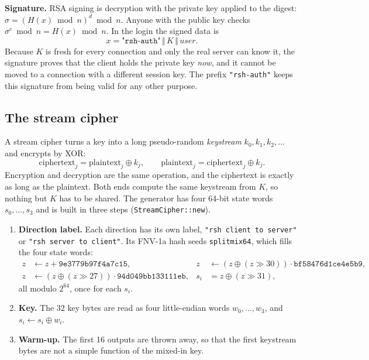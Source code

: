 \textbf{Signature.} RSA signing is decryption with the private key applied to
the digest: $\sigma = (H(x) \bmod n)^{d} \bmod n$. Anyone with the public key
checks $\sigma^{e} \bmod n = H(x) \bmod n$. In the login the signed data is
\[
  x = \texttt{"rsh-auth"} \,\Vert\, K \,\Vert\, \textit{user}.
\]
Because $K$ is fresh for every connection and only the real server can know it,
the signature proves that the client holds the private key \emph{now}, and it
cannot be moved to a connection with a different session key. The prefix
\texttt{"rsh-auth"} keeps this signature from being valid for any other purpose.

\begin{table}[H]
\centering
\footnotesize

\caption{The login signature of the recorded session. $n_c$, $d_c$ are the client's key (\texttt{id\_rsh}).}
\label{tab:auth}
\end{table}

\subsection{The stream cipher}
\label{sec:cipher}

A stream cipher turns a key into a long pseudo-random \emph{keystream}
$k_0, k_1, k_2, \ldots$ and encrypts by XOR:
\[
  \text{ciphertext}_j = \text{plaintext}_j \oplus k_j, \qquad
  \text{plaintext}_j = \text{ciphertext}_j \oplus k_j .
\]
Encryption and decryption are the same operation, and the ciphertext is exactly
as long as the plaintext. Both ends compute the same keystream from $K$, so
nothing but $K$ has to be shared. The generator has four 64-bit state words
$s_0, \ldots, s_3$ and is built in three steps (\texttt{StreamCipher::new}).

\begin{enumerate}
\item \textbf{Direction label.} Each direction has its own label,
  \texttt{"rsh client to server"} or \texttt{"rsh server to client"}. Its
  FNV-1a hash seeds \texttt{splitmix64}, which fills the four state words:
  \begin{align*}
    z &\leftarrow z + \texttt{9e3779b97f4a7c15}, &
    z &\leftarrow (z \oplus (z \gg 30)) \cdot \texttt{bf58476d1ce4e5b9}, \\
    z &\leftarrow (z \oplus (z \gg 27)) \cdot \texttt{94d049bb133111eb}, &
    s_i &= z \oplus (z \gg 31),
  \end{align*}
  all modulo $2^{64}$, once for each $s_i$.
\item \textbf{Key.} The 32 key bytes are read as four little-endian words
  $w_0, \ldots, w_3$, and $s_i \leftarrow s_i \oplus w_i$.
\item \textbf{Warm-up.} The first 16 outputs are thrown away, so that the
  first keystream bytes are not a simple function of the mixed-in key.
\end{enumerate}

